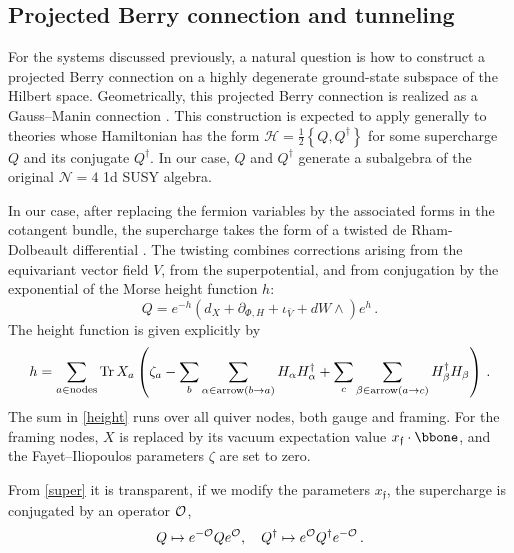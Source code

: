 \documentclass[10pt]{article}
\theoremstyle{definition}
\def\Tr{{\rm Tr}}
\def\p{\partial}
\def\CO {{\cal O}}
\def\CO {{\cal O}}
\def\ff{\mathfrak{f}}
\def\sH{{\mathscr{H}}}
\def\lm{\limits}
\numberwithin{equation}{section}
\begin{document}
\subsection{Projected Berry connection and tunneling} \label{sec:Berry}

For the systems discussed previously, a natural question is how to construct a projected Berry connection on a highly degenerate ground-state subspace of the Hilbert space.
Geometrically, this projected Berry connection is realized as a Gauss--Manin connection \cite{manin1958algebraic,Moore:2017byz,Dedushenko:2022pem,Ferrari:2023hza}.
This construction is expected to apply generally to theories whose Hamiltonian has the form $\sH=\frac{1}{2}\left\{Q,Q^{\dagger}\right\}$ for some supercharge $Q$ and its conjugate $Q^{\dagger}$.
In our case, $Q$ and $Q^{\dagger}$ generate a subalgebra of the original $\mathcal{N}=4$ 1d SUSY algebra.

In our case, after replacing the fermion variables by the associated forms in the cotangent bundle, the supercharge takes the form of a twisted de Rham-Dolbeault differential \cite{Galakhov:2020vyb}.
The twisting combines corrections arising from the equivariant vector field $V$, from the superpotential, and from conjugation by the exponential of the Morse height function $h$:
\begin{equation}\label{super}
	Q=e^{-h}\left(d_X+\p_{\Phi, H}+\iota_{\bar V}+dW\wedge\right)e^h\,. 
\end{equation}
The height function is given explicitly by
\begin{equation}\label{height}
	h=\sum\lm_{a\in {\rm nodes}}\Tr\, X_a\left(\zeta_a-\sum\lm_{b}\sum\lm_{\alpha\in{\rm arrow}(b\to a)}H_{\alpha}H_{\alpha}^{\dagger}+\sum\lm_c\sum\lm_{\beta\in{\rm arrow}(a\to c)}H^{\dagger}_{\beta}H_{\beta}\right)\,. 
\end{equation}
The sum in \eqref{height} runs over all quiver nodes, both gauge and framing.
For the framing nodes, $X$ is replaced by its vacuum expectation value $x_{\ff}\cdot\bbone$, and the Fayet--Iliopoulos parameters $\zeta$ are set to zero.

From \eqref{super} it is transparent, if we modify the parameters $x_{\ff}$, the supercharge is conjugated by an operator $\CO$,
\begin{equation}
	Q\mapsto e^{-\CO}Qe^{\CO},\quad Q^{\dagger}\mapsto e^{\CO}Q^{\dagger}e^{-\CO}\,.
\end{equation}
\end{document}
